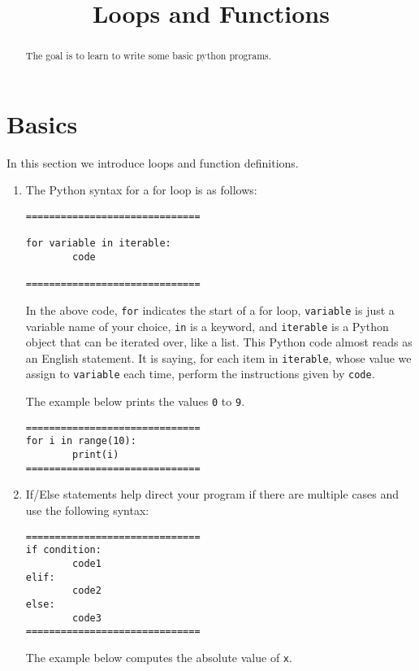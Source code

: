 \documentclass{ximera}
\title{Loops and Functions}
\begin{document}
\begin{abstract}
The goal is to learn to write some basic python programs.
\end{abstract}
\maketitle

\section{Basics}

In this section we introduce loops and function definitions.

    \begin{enumerate}
        \item The Python syntax for a for loop is as follows:

\begin{verbatim}
==============================

for variable in iterable:
        code

==============================
\end{verbatim}

In the above code, \verb|for| indicates the start of a for loop, \verb|variable| is just a variable name of your choice, \verb|in| is a keyword, and \verb|iterable| is a Python object that can be iterated over, like a list. This Python code almost reads as an English statement. It is saying, for each item in \verb|iterable|, whose value we assign to \verb|variable| each time, perform the instructions given by \verb|code|.

The example below prints the values \verb|0| to \verb|9|.

\begin{verbatim}
==============================
for i in range(10):
        print(i)
==============================
\end{verbatim}

        \item If/Else statements help direct your program if there are multiple cases and use the following syntax:
\begin{verbatim}
==============================
if condition:
        code1
elif:
        code2
else:
        code3
==============================
\end{verbatim}

The example below computes the absolute value of \verb|x|.


\end{enumerate}
\end{document}
